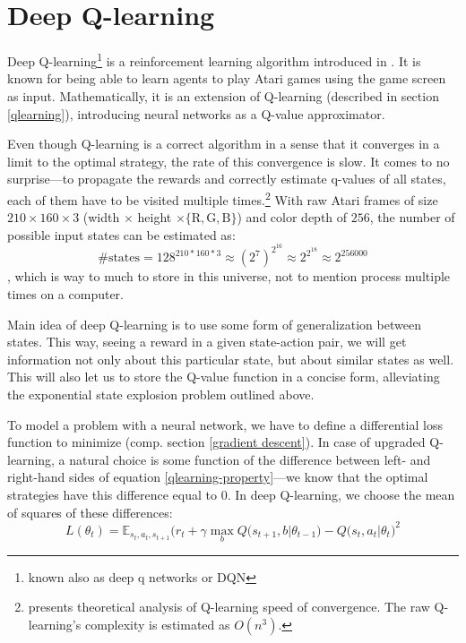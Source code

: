 \chapter{Deep Q-learning}\label{dqn}
Deep Q-learning\footnote{known also as deep q networks or DQN} is a reinforcement learning algorithm introduced in \cite{nips-dqn}. It is known for being able to learn agents to play Atari games using the game screen as input. Mathematically, it is an extension of Q-learning (described in section \ref{qlearning}), introducing neural networks as a Q-value approximator.

Even though Q-learning is a correct algorithm in a sense that it converges in a limit to the optimal strategy, the rate of this convergence is slow. It comes to no surprise---to propagate the rewards and correctly estimate q-values of all states, each of them have to be visited multiple times.\footnote{\cite{qlearning-complexity} presents theoretical analysis of Q-learning speed of convergence. The raw Q-learning's complexity is estimated as $O(n^3)$.}
With raw Atari frames of size $210 \times 160 \times 3$ (width $\times$ height $\times \{\text{R}, \text{G}, \text{B}\}$) and color depth of $256$, the number of possible input states can be estimated as:
\begin{equation}
  \mbox{\# states} = 128^{210*160*3} \approx (2^7)^{2^{16}} \approx 2^{2^{18}} \approx 2^{256000}
\end{equation}\label{number-frame-states},
which is way to much to store in this universe, not to mention process multiple times on a computer.

Main idea of deep Q-learning is to use some form of generalization between states. This way, seeing a reward in a given state-action pair, we will get information not only about this particular state, but about similar states as well. This will also let us to store the Q-value function in a concise form, alleviating the exponential state explosion problem outlined above.

To model a problem with a neural network, we have to define a differential loss function to minimize (comp. section \ref{gradient descent}). In case of upgraded  Q-learning, a natural choice is some function of the difference between left- and right-hand sides of equation \eqref{qlearning-property}---we know that the optimal strategies have this difference equal to $0$. In deep Q-learning, we choose the mean of squares of these differences:
\begin{equation}\label{dqn-loss}
  L(\theta_t) = \mathbb{E}_{s_t, a_t, s_{t+1}} \big(r_t + \gamma \max_b Q(s_{t+1}, b|\theta_{t-1}) - Q(s_t, a_t|\theta_t\big)^2
\end{equation}

